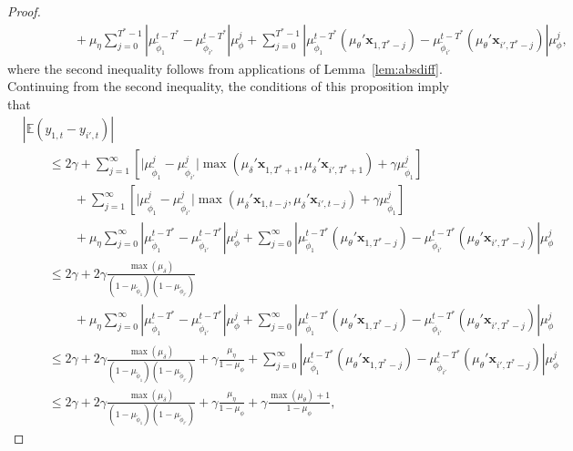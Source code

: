 \documentclass[11pt]{article}
\newcommand{\x}{\textbf{x}}
\def\E{\mathbb{E}} %
\theoremstyle{definition}
\begin{document}
\begin{proof}
\begin{align*}
	&\qquad\qquad + \mu_\eta\sum_{j=0}^{T^*-1}\left\vert \mu_{\tilde\phi_{1}}^{t - T^*} - \mu_{\tilde\phi_{i'}}^{t - T^*}\right\vert\mu_{\phi}^j + \sum_{j=0}^{T^*-1}\left\vert \mu_{\tilde\phi_{1}}^{t - T^*}(\mu_{\theta}'\x_{1,T^*-j}) - \mu_{\tilde\phi_{i'}}^{t - T^*}(\mu_{\theta}'\x_{i',T^*-j}) \right\vert\mu_{\phi}^j,	
\end{align*}
where the second inequality follows from applications of Lemma~\ref{lem:absdiff}. Continuing from the second inequality, the conditions of this proposition imply that
\begin{align*}
  &|\E(y_{1,t} - y_{i',t})|	\\
  &\qquad\leq 2\gamma + \sum_{j=1}^{\infty}\left[\vert\mu_{\tilde\phi_{1}}^j - \mu_{\tilde\phi_{i'}}^j\vert\max(\mu_\delta'\x_{1,T^*+1},\mu_\delta'\x_{i',T^*+1}) + \gamma\mu_{\tilde\phi_{1}}^j\right] \\
  &\qquad\qquad + \sum_{j=1}^{\infty}\left[\vert\mu_{\tilde\phi_{1}}^j - \mu_{\tilde\phi_{i'}}^j\vert\max(\mu_\delta'\x_{1,t-j},\mu_\delta'\x_{i',t-j}) + \gamma\mu_{\tilde\phi_{1}}^j\right] \\
  &\qquad\qquad + \mu_\eta\sum_{j=0}^{\infty}\left\vert \mu_{\tilde\phi_{1}}^{t - T^*} - \mu_{\tilde\phi_{i'}}^{t - T^*}\right\vert\mu_{\phi}^j + \sum_{j=0}^{\infty}\left\vert \mu_{\tilde\phi_{1}}^{t - T^*}(\mu_{\theta}'\x_{1,T^*-j}) - \mu_{\tilde\phi_{i'}}^{t - T^*}(\mu_{\theta}'\x_{i',T^*-j}) \right\vert\mu_{\phi}^j  \\
  &\qquad\leq 2\gamma + 2\gamma\frac{\max(\mu_\delta)}{(1 - \mu_{\tilde\phi_{1}})(1 - \mu_{\tilde\phi_{i'}})} \\
  &\qquad\qquad + \mu_\eta\sum_{j=0}^{\infty}\left\vert \mu_{\tilde\phi_{1}}^{t - T^*} - \mu_{\tilde\phi_{i'}}^{t - T^*}\right\vert\mu_{\phi}^j + \sum_{j=0}^{\infty}\left\vert \mu_{\tilde\phi_{1}}^{t - T^*}(\mu_{\theta}'\x_{1,T^*-j}) - \mu_{\tilde\phi_{i'}}^{t - T^*}(\mu_{\theta}'\x_{i',T^*-j}) \right\vert\mu_{\phi}^j \\
  &\qquad\leq 2\gamma + 2\gamma\frac{\max(\mu_\delta)}{(1 - \mu_{\tilde\phi_{1}})(1 - \mu_{\tilde\phi_{i'}})} + \gamma\frac{\mu_{\eta}}{1 - \mu_{\phi}} + \sum_{j=0}^{\infty}\left\vert \mu_{\tilde\phi_{1}}^{t - T^*}(\mu_{\theta}'\x_{1,T^*-j}) - \mu_{\tilde\phi_{i'}}^{t - T^*}(\mu_{\theta}'\x_{i',T^*-j}) \right\vert\mu_{\phi}^j \\
  &\qquad\leq 2\gamma + 2\gamma\frac{\max(\mu_\delta)}{(1 - \mu_{\tilde\phi_{1}})(1 - \mu_{\tilde\phi_{i'}})} + \gamma\frac{\mu_{\eta}}{1 - \mu_{\phi}} + \gamma\frac{\max(\mu_\theta) + 1}{1 - \mu_\phi}, 
\end{align*}  

\end{proof}
\end{document}
